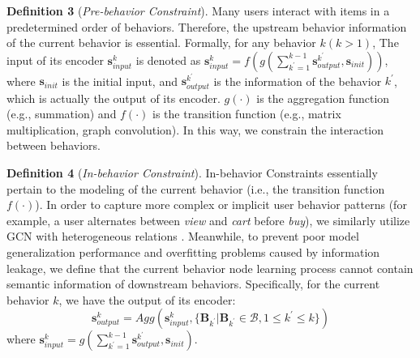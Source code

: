 \textbf{Definition 3} (\textit{Pre-behavior Constraint}). Many users interact with items in a predetermined order of behaviors. Therefore, the upstream behavior information of the current behavior is essential. Formally, for any behavior $k (k>1)$, 
The input of its encoder $\mathbf{s}_{input}^{k}$ is denoted as 
$\mathbf{s}_{input}^{k}=f(g(\sum_{k^{\prime}=1}^{k - 1}\mathbf{s}_{output}^{k^{\prime}},\mathbf{s}_{init}))$, where 
$\mathbf{s}_{init}$ is the initial input, and $\mathbf{s}_{output}^{k^{\prime}}$ is the information of the behavior $k^{\prime}$, which is actually the output of its encoder. $g(\cdot)$ is the aggregation function (e.g., summation) and $f(\cdot)$ is the transition function (e.g., matrix multiplication, graph convolution). In this way, we constrain the interaction between behaviors.


\textbf{Definition 4} (\textit{In-behavior Constraint}). In-behavior Constraints essentially pertain to the modeling of the current behavior (i.e., the 
transition function $f(\cdot)$). In order to capture more complex or implicit user behavior patterns (for example, a user alternates between \textit{view} and \textit{cart} before \textit{buy}), we similarly utilize GCN with heterogeneous relations \cite{mbgcn}.  Meanwhile, to prevent poor model generalization performance and overfitting problems caused by information leakage, we define that the current behavior node learning process cannot contain semantic information of downstream behaviors. Specifically, for the current behavior $k$, we have the output of its encoder:
\begin{equation}
\mathbf{s}_{output}^{k}=Agg(\mathbf{s}_{input}^{k},\{\mathbf{B}_{k^{\prime}}|\mathbf{B}_{k^{\prime}}\in \mathcal{B},1\leq k^{\prime}\leq k\})
\end{equation}
where $\mathbf{s}_{input}^{k} = g(\sum_{k^{\prime}=1}^{k - 1}\mathbf{s}_{output}^{k^{\prime}},\mathbf{s}_{init})$.

